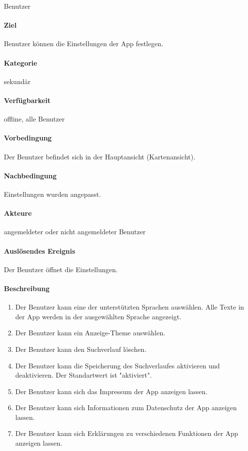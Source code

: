 \Gls{Benutzer}\paragraph{Ziel}
Benutzer können die Einstellungen der App festlegen.
\paragraph{Kategorie}
sekundär
\paragraph{Verfügbarkeit}
offline, alle Benutzer
\paragraph{Vorbedingung}
Der Benutzer befindet sich in der Hauptansicht (Kartenansicht).
\paragraph{Nachbedingung}
Einstellungen wurden angepasst.
\paragraph{Akteure}
angemeldeter oder nicht angemeldeter Benutzer
\paragraph{Auslösendes Ereignis}
Der Benutzer öffnet die Einstellungen.
\paragraph{Beschreibung}
\begin{enumerate}[start=50, label=\textbf{/FA\arabic*/}, align=left]
    \item Der \Gls{Benutzer} kann eine der unterstützten Sprachen auswählen. Alle Texte in der App werden in der ausgewählten Sprache angezeigt.
    \item Der \Gls{Benutzer} kann ein Anzeige-Theme auswählen.
    \item Der \Gls{Benutzer} kann den Suchverlauf löschen.
    \item Der \Gls{Benutzer} kann die Speicherung des Suchverlaufes aktivieren und deaktivieren. Der Standartwert ist "aktiviert".
    \item Der \Gls{Benutzer} kann sich das Impressum der App anzeigen lassen.
    \item Der \Gls{Benutzer} kann sich Informationen zum Datenschutz der App anzeigen lassen.
    \item Der \Gls{Benutzer} kann sich Erklärungen zu verschiedenen Funktionen der App anzeigen lassen.
\end{enumerate}